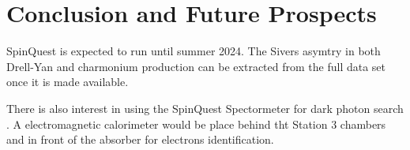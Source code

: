\documentclass[../main.tex]{subfiles}
\begin{document}
\ifSubfilesClassLoaded{
	\mainmatter
	\setcounter{chapter}{5}
}{}

\chapter{Conclusion and Future Prospects}
\label{ch:conclusion}
SpinQuest is expected to run until summer 2024. The Sivers
asymtry in both Drell-Yan and charmonium production can be extracted from the full
data set once it is made available.

There is also interest in using the SpinQuest Spectormeter for dark photon search
\cite{apyan2022}. A electromagnetic calorimeter would be place behind tht Station 3 chambers and 
in front of the absorber for electrons identification.

\ifSubfilesClassLoaded{ \printbibliography[heading=bibintoc,title={References}]}{}
\end{document}
